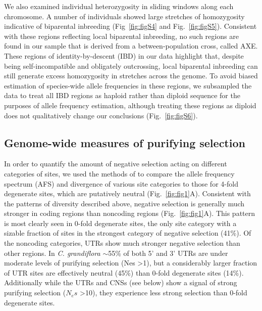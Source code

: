 We also examined individual heterozygosity in sliding windows along each chromosome. A number of individuals showed large stretches of homozygosity indicative of biparental inbreeding (Fig~\ref{fig:figS4} and Fig.~\ref{fig:figS5}). Consistent with these regions reflecting local biparental inbreeding, no such regions are found in our sample that is derived from a between-population cross, called AXE. These regions of identity-by-descent (IBD) in our data highlight that, despite being self-incompatible and obligately outcrossing, local biparental inbreeding can still generate excess homozygosity in stretches across the genome. To avoid biased estimation of species-wide allele frequencies in these regions, we subsampled the data to treat all IBD regions as haploid rather than diploid sequence for the purposes of allele frequency estimation, although treating these regions as diploid does not qualitatively change our conclusions (Fig.~\ref{fig:figS6}).

\subsection{Genome-wide measures of purifying selection}
In order to quantify the amount of negative selection acting on different categories of sites, we used the methods of \citet{keightley2010} to compare the allele frequency spectrum (AFS) and divergence of various site categories to those for 4-fold degenerate sites, which are putatively neutral (Fig.~\ref{fig:fig1}A). Consistent with the patterns of diversity described above, negative selection is generally much stronger in coding regions than noncoding regions (Fig.~\ref{fig:fig1}A). This pattern is most clearly seen in 0-fold degenerate sites, the only site category with a sizable fraction of sites in the strongest category of negative selection (41\%). Of the noncoding categories, UTRs show much stronger negative selection than other regions. In \textit{C. grandiflora} $\sim$55\% of both 5' and 3' UTRs are under moderate levels of purifying selection (Nes \textgreater 1), but a considerably larger fraction of UTR sites are effectively neutral (45\%) than 0-fold degenerate sites (14\%). Additionally while the UTRs and CNSs (see below) show a signal of strong purifying selection ($N_{e}s$ \textgreater 10), they experience less strong selection than 0-fold degenerate sites. 

